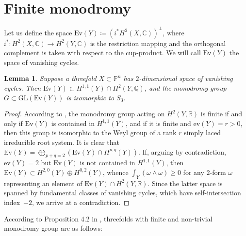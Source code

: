 \documentclass[a4paper]{amsart}
\theoremstyle{plain}
\newtheorem{lemma}[theorem]{Lemma}
\theoremstyle{definition}
\begin{document}
\section{Finite monodromy}
\label{finite_monodromy}
Let us define the space $\mathrm{Ev}(Y)\coloneqq (i^*H^2(X,\mathbb C))^\perp$, where $i^*\colon H^2(X,\mathbb C)\to H^2(Y,\mathbb C)$ is the restriction mapping and the orthogonal complement is taken with respect to the cup-product.
We will call $\mathrm{Ev}(Y)$ the space of vanishing cycles.
\begin{lemma}
\label{finite_monodromy_lemma}
Suppose a threefold $X\subset \mathbb P^n$ has $2$-dimensional space of vanishing cycles.
Then $\mathrm{Ev}(Y) \subset H^{1,1}(Y) \cap H^2(Y, \mathbb Q)$, and the monodromy group $G \subset \mathrm{GL}(\mathrm{Ev}(Y))$ is isomorphic to $S_3$.
\end{lemma}
\begin{proof}
    According to \cite[Expos\'e XIX]{sga}, the monodromy group acting on $H^2(Y,\mathbb R)$ is finite if and only if $\mathrm{Ev}(Y)$ is contained in $H^{1,1}(Y)$, and if it is finite and $\mathrm{ev}(Y)=r >0$,
    then this group is isomorphic to the Weyl group of a rank $r$  simply laced irreducible root system.
    It is clear that $\mathrm{Ev}(Y)=\bigoplus_{p+q=2}(\mathrm{Ev}(Y)\cap H^{p,q}(Y))$.
    If, arguing by contradiction, $\mathrm{ev}(Y)=2$ but $\mathrm{Ev}(Y)$ is not contained in $H^{1,1}(Y)$,
    then $\mathrm{Ev}(Y)\subset H^{2,0}(Y)\oplus H^{0,2}(Y)$, whence $\int _Y(\omega\wedge\omega)\geq0$ for any $2$-form $\omega$ representing an element of $\mathrm{Ev}(Y)\cap H^2(Y,\mathbb R)$.
    Since the latter space is spanned by fundamental classes of vanishing cycles, which have self-intersection index~$-2$, we arrive at a contradiction.
\end{proof}
According to Proposition 4.2 in \cite{Lvovski}, threefolds with finite and non-trivial monodromy group are as follows:
\end{document}
